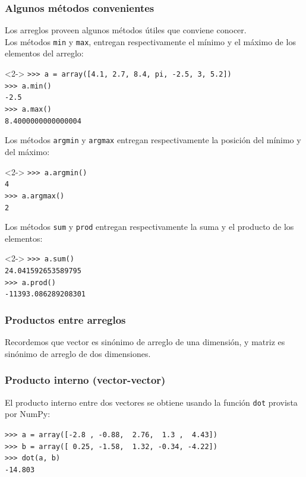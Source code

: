 \begin{frame}[fragile]
\frametitle{Algunos métodos convenientes}
Los arreglos proveen algunos métodos útiles que conviene conocer.
\\
\bigskip
Los métodos \texttt{min} y \texttt{max}, entregan respectivamente el mínimo y el máximo de los elementos del arreglo:
\begin{exampleblock}{}<2->
\verb|>>> a = array([4.1, 2.7, 8.4, pi, -2.5, 3, 5.2])| \\
\pause
\verb|>>> a.min()| \\
\pause
\verb|-2.5| \\
\pause
\verb|>>> a.max()| \\
\pause
\verb|8.4000000000000004|
\end{exampleblock}
\end{frame}
\begin{frame}[fragile]
Los métodos \texttt{argmin} y \texttt{argmax} entregan respectivamente la posición del mínimo y del máximo:
\begin{exampleblock}{}<2->
\verb|>>> a.argmin()| \\
\pause
\verb|4| \\
\pause
\verb|>>> a.argmax()| \\
\pause
\verb|2|
\end{exampleblock}
\end{frame}
\begin{frame}[fragile]
Los métodos \texttt{sum} y \texttt{prod} entregan respectivamente la suma y el producto de los elementos:
\begin{exampleblock}{}<2->
\verb|>>> a.sum()| \\
\pause
\verb|24.041592653589795| \\
\pause
\verb|>>> a.prod()| \\
\pause
\verb|-11393.086289208301|
\end{exampleblock}
\end{frame}
\begin{frame}
\frametitle{Productos entre arreglos}
Recordemos que vector es sinónimo de arreglo de una dimensión, y matriz es sinónimo de arreglo de dos dimensiones.
\end{frame}
\begin{frame}[fragile]
\frametitle{Producto interno (vector-vector)}
El producto interno entre dos vectores se obtiene usando la función \texttt{dot} provista por NumPy:
\fontsize{12}{12}\selectfont
\begin{exampleblock}{}
\verb|>>> a = array([-2.8 , -0.88,  2.76,  1.3 ,  4.43])| \\
\verb|>>> b = array([ 0.25, -1.58,  1.32, -0.34, -4.22])| \\
\pause
\verb|>>> dot(a, b)| \\
\pause
\verb|-14.803|
\end{exampleblock}
\end{frame}
